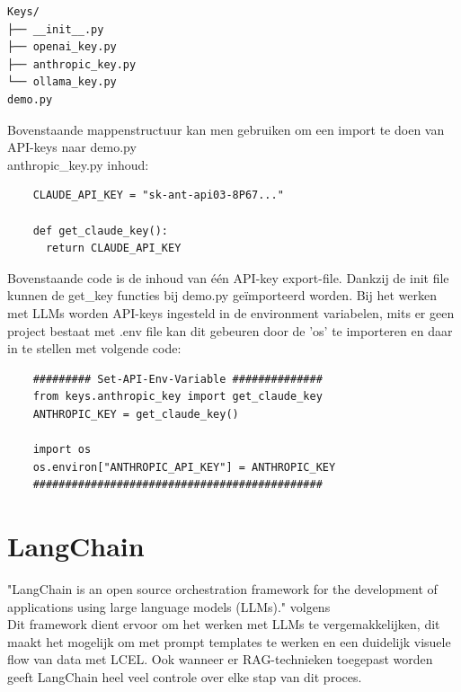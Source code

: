 \begin{verbatim}
Keys/
├── __init__.py
├── openai_key.py
├── anthropic_key.py
└── ollama_key.py
demo.py
\end{verbatim}

Bovenstaande mappenstructuur kan men gebruiken om een import te doen van API-keys naar demo.py \\

anthropic\_key.py inhoud: \\
\begin{verbatim}
    CLAUDE_API_KEY = "sk-ant-api03-8P67..."
    
    def get_claude_key():
      return CLAUDE_API_KEY
\end{verbatim}

Bovenstaande code is de inhoud van één API-key export-file. Dankzij de init file kunnen de get\_key functies bij demo.py geïmporteerd worden.
Bij het werken met LLMs worden API-keys ingesteld in de environment variabelen, mits er geen project bestaat met .env file kan dit gebeuren door de 'os' te importeren en daar in te stellen met volgende code:

\begin{verbatim}
    ######### Set-API-Env-Variable ##############
    from keys.anthropic_key import get_claude_key
    ANTHROPIC_KEY = get_claude_key()
    
    import os
    os.environ["ANTHROPIC_API_KEY"] = ANTHROPIC_KEY
    #############################################
\end{verbatim}

\section{LangChain}%
\label{sec:langchain}


"LangChain is an open source orchestration framework for the development of applications using large language models (LLMs)." volgens \autocite{Bergmanna} \\

Dit framework dient ervoor om het werken met LLMs te vergemakkelijken, dit maakt het mogelijk om met prompt templates te werken en een duidelijk visuele flow van data met LCEL. Ook wanneer er RAG-technieken toegepast worden geeft LangChain heel veel controle over elke stap van dit proces. \\

